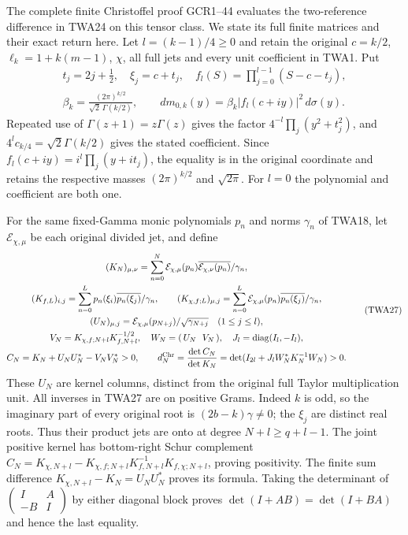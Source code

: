 The complete finite Christoffel proof GCR1--44 evaluates the
two-reference difference in TWA24 on this tensor class.
We state its full finite matrices and their exact return here.
Let $l=(k-1)/4\geq0$ and retain the original $c=k/2$,
$\ell_k=1+k(m-1)$, $\chi$, all full jets and every unit
coefficient in TWA1. Put
\[
\begin{gathered}
 t_j=2j+\tfrac12,\quad \xi_j=c+t_j,\quad
 f_l(S)=\prod_{j=0}^{l-1}(S-c-t_j),\\
 \beta_k=\frac{(2\pi)^{k/2}}{\sqrt2\,\Gamma(k/2)},\qquad
 dm_{0,k}(y)=\beta_k|f_l(c+iy)|^2\,d\sigma(y).
\end{gathered}\tag{TWA26}
\]
Repeated use of $\Gamma(z+1)=z\Gamma(z)$ gives the factor
$4^{-l}\prod_j(y^2+t_j^2)$, and
$4^lc_{k/4}=\sqrt2\Gamma(k/2)$ gives the stated coefficient.
Since $f_l(c+iy)=i^l\prod_j(y+it_j)$, the equality is in
the original coordinate and retains the respective masses
$(2\pi)^{k/2}$ and $\sqrt{2\pi}$. For $l=0$ the polynomial
and coefficient are both one.

For the same fixed-Gamma monic polynomials $p_n$ and
norms $\gamma_n$ of TWA18, let $\mathcal E_{\chi,\mu}$
be each original divided jet, and define
\[
\begin{gathered}
 (K_N)_{\mu,\nu}
 =\sum_{n=0}^N\mathcal E_{\chi,\mu}(p_n)
      \overline{\mathcal E_{\chi,\nu}(p_n)}/\gamma_n,\\
 (K_{f,L})_{i,j}
 =\sum_{n=0}^L p_n(\xi_i)\overline{p_n(\xi_j)}/\gamma_n,\qquad
 (K_{\chi,f;L})_{\mu,j}
 =\sum_{n=0}^L\mathcal E_{\chi,\mu}(p_n)
                         \overline{p_n(\xi_j)}/\gamma_n,\\
 (U_N)_{\mu,j}=\mathcal E_{\chi,\mu}(p_{N+j})
                               /\sqrt{\gamma_{N+j}}\quad(1\leq j\leq l),\\
 V_N=K_{\chi,f;N+l}K_{f,N+l}^{-1/2},\quad
 W_N=(\,U_N\ \ V_N\,),\quad J_l=\operatorname{diag}(I_l,-I_l),\\
 C_N=K_N+U_NU_N^*-V_NV_N^*>0,\qquad
 d_N^{\rm Chr}=\frac{\det C_N}{\det K_N}
       =\det(I_{2l}+J_lW_N^*K_N^{-1}W_N)>0.
\end{gathered}\tag{TWA27}
\]
These $U_N$ are kernel columns, distinct from the original
full Taylor multiplication unit. All inverses in TWA27
are on positive Grams. Indeed $k$ is odd, so the imaginary
part of every original root is $(2b-k)\gamma\ne0$;
the $\xi_j$ are distinct real roots. Thus their product
jets are onto at degree $N+l\geq q+l-1$. The joint
positive kernel has bottom-right Schur complement
$C_N=K_{\chi,N+l}-K_{\chi,f;N+l}
K_{f,N+l}^{-1}K_{f,\chi;N+l}$, proving positivity.
The finite sum difference
$K_{\chi,N+l}-K_N=U_NU_N^*$ proves its formula.
Taking the determinant of
$\left(\begin{smallmatrix}I&A\\-B&I\end{smallmatrix}\right)$
by either diagonal block proves
$\det(I+AB)=\det(I+BA)$ and hence the last equality.

